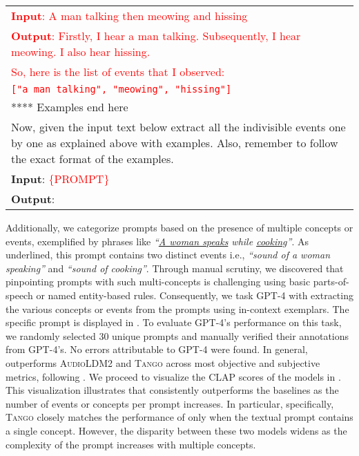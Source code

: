 \begin{table*}[ht!]
\begin{tabular}{|p{15cm}|}
    \textcolor{red}{\textbf{Input}: A man talking then meowing and hissing}\\
    \textcolor{red}{\textbf{Output}: Firstly, I hear a man talking. Subsequently, I hear meowing. I also hear hissing.}\\
    \textcolor{red}{So, here is the list of events that I observed:}\\
    \textcolor{red}{\texttt{["a man talking", "meowing", "hissing"]}}\\
    **** Examples end here\\
    Now, given the input text below extract all the indivisible events one by one as explained above with examples. Also, remember to follow the exact format of the examples.\\
    \textbf{Input}: \textcolor{red}{\{PROMPT\}}\\
    \textbf{Output}: \\
        \hline
    \end{tabular}
    \label{tab:gpt4-event}
\end{table*}

Additionally, we categorize prompts based on the presence of multiple concepts or events, exemplified by phrases like \textit{``\ul{A woman speaks} while \ul{cooking}''}. As underlined, this prompt contains two distinct events i.e., \emph{``sound of a woman speaking''} and \emph{``sound of cooking''}. Through manual scrutiny, we discovered that pinpointing prompts with such multi-concepts is challenging using basic parts-of-speech or named entity-based rules. Consequently, we task GPT-4 with extracting the various concepts or events from the prompts using in-context exemplars. The specific prompt is displayed in . To evaluate GPT-4's performance on this task, we randomly selected 30 unique prompts and manually verified their annotations from GPT-4's. No errors attributable to GPT-4 were found. In general, \model{} outperforms \textsc{AudioLDM2} and \textsc{Tango} across most objective and subjective metrics, following . We proceed to visualize the CLAP scores of the models in . This visualization illustrates that \model{} consistently outperforms the baselines as the number of events or concepts per prompt increases. In particular, specifically, \textsc{Tango} closely matches the performance of \model{} only when the textual prompt contains a single concept. However, the disparity between these two models widens as the complexity of the prompt increases with multiple concepts.

